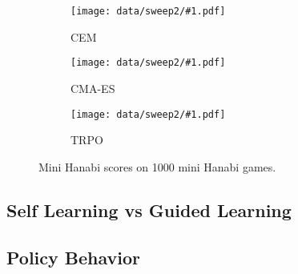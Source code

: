 \begin{figure}[ht]
  \newcommand{\algosubfig}[3]{%
    \begin{subfigure}[b]{0.32\textwidth}
      \centering
      \texttt{[image: data/sweep2/\#1.pdf]}
      \caption{#2}\label{fig:#3}
    \end{subfigure}
  }

  \centering
  \algosubfig{CEM}{CEM}{cem}
  \algosubfig{CMA-ES}{CMA-ES}{cmaes}
  \algosubfig{TRPO}{TRPO}{trpo}
  \caption{Mini Hanabi scores on 1000 mini Hanabi games.}\label{fig:algos}
\end{figure}

\subsection{Self Learning vs Guided Learning}

\subsection{Policy Behavior}
